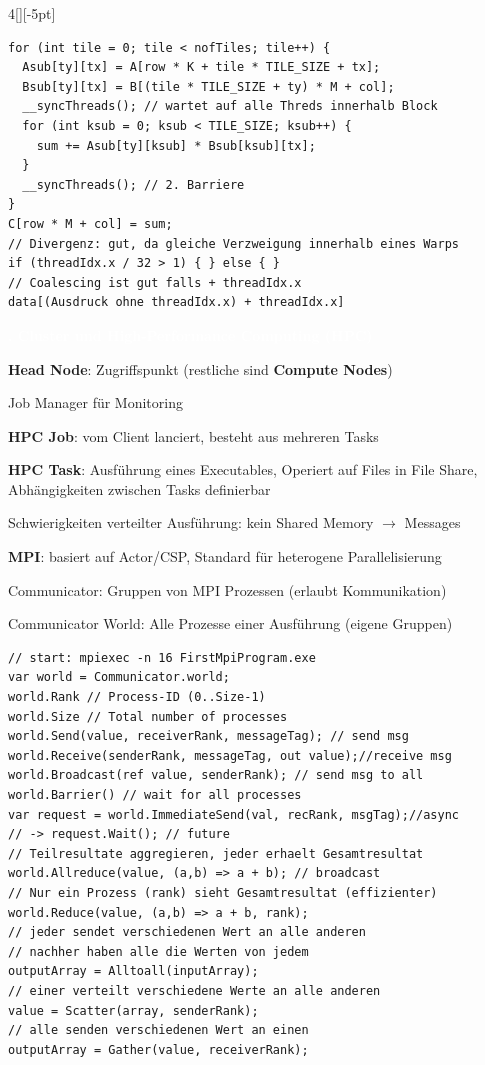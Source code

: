 \documentclass[%
	pdftex,%
	a4paper,%
	landscape,%
	ngerman,
	oneside,%
	6pt,%
	halfparskip,%
]{scrbook}
\newenvironment{mainbox}{%
  \def\FrameCommand{\fboxrule 1px \fcolorbox{black}{spec_blue}}%
  \MakeFramed {\advance\hsize-\width \FrameRestore}}%
 {\endMakeFramed}
\newcommand{\maintopic}[1]{\setcounter{subtopicenum}{0}\setcounter{subsubtopicenum}{0}\vspace{-4px}\begin{mainbox}\textcolor{white}{\textbf{\large{\stepcounter{maintopicenum}\Roman{maintopicenum}. #1}}}\end{mainbox}\vspace{-4px}}
\newenvironment{tight-itemize}
{ \begin{itemize}[leftmargin=*, nosep]
    \setlength{\itemsep}{0px}
    \setlength{\parskip}{0px}
    \setlength{\parsep}{0px}  }
{ \end{itemize}                  }
\begin{document}
\begin{multicols}{4}[][-5pt]
\begin{lstlisting}
for (int tile = 0; tile < nofTiles; tile++) {
  Asub[ty][tx] = A[row * K + tile * TILE_SIZE + tx];
  Bsub[ty][tx] = B[(tile * TILE_SIZE + ty) * M + col];
  __syncThreads(); // wartet auf alle Threds innerhalb Block
  for (int ksub = 0; ksub < TILE_SIZE; ksub++) {
    sum += Asub[ty][ksub] * Bsub[ksub][tx];
  }
  __syncThreads(); // 2. Barriere
}
C[row * M + col] = sum;
// Divergenz: gut, da gleiche Verzweigung innerhalb eines Warps
if (threadIdx.x / 32 > 1) { } else { }
// Coalescing ist gut falls + threadIdx.x
data[(Ausdruck ohne threadIdx.x) + threadIdx.x]
\end{lstlisting}
\maintopic{Cluster und High-Performance Computing (HPC)}
\begin{tight-itemize}
	\item{\textbf{Head Node}: Zugriffspunkt (restliche sind \textbf{Compute Nodes})}
	\item{Job Manager für Monitoring}
	\item{\textbf{HPC Job}: vom Client lanciert, besteht aus mehreren Tasks}
	\item{\textbf{HPC Task}: Ausführung eines Executables, Operiert auf Files in File Share, Abhängigkeiten zwischen Tasks definierbar}
	\item{Schwierigkeiten verteilter Ausführung: kein Shared Memory $\rightarrow$ Messages} 
	\item{\textbf{MPI}: basiert auf Actor/CSP, Standard für heterogene Parallelisierung}
	\item{Communicator: Gruppen von MPI Prozessen (erlaubt Kommunikation)}
	\item{Communicator World: Alle Prozesse einer Ausführung (eigene Gruppen)}
\end{tight-itemize}

\begin{lstlisting}
// start: mpiexec -n 16 FirstMpiProgram.exe
var world = Communicator.world;
world.Rank // Process-ID (0..Size-1)
world.Size // Total number of processes
world.Send(value, receiverRank, messageTag); // send msg
world.Receive(senderRank, messageTag, out value);//receive msg
world.Broadcast(ref value, senderRank); // send msg to all
world.Barrier() // wait for all processes
var request = world.ImmediateSend(val, recRank, msgTag);//async
// -> request.Wait(); // future
// Teilresultate aggregieren, jeder erhaelt Gesamtresultat
world.Allreduce(value, (a,b) => a + b); // broadcast
// Nur ein Prozess (rank) sieht Gesamtresultat (effizienter)
world.Reduce(value, (a,b) => a + b, rank);
// jeder sendet verschiedenen Wert an alle anderen
// nachher haben alle die Werten von jedem
outputArray = Alltoall(inputArray);
// einer verteilt verschiedene Werte an alle anderen
value = Scatter(array, senderRank);
// alle senden verschiedenen Wert an einen
outputArray = Gather(value, receiverRank);
\end{lstlisting}


\end{multicols}
\end{document}
